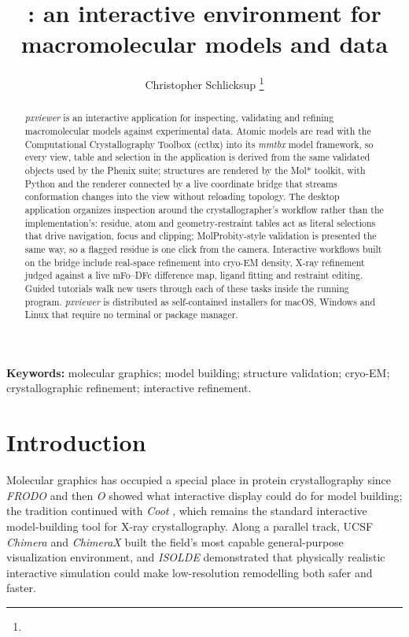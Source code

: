 \documentclass[11pt]{article}
\title{\pxviewer: an interactive environment for macromolecular models and data}
\author{Christopher Schlicksup%
  \thanks{\todo{affiliation and contact email}}}
\date{}
\newcommand{\pxviewer}{\emph{pxviewer}}
\begin{document}
\maketitle

\begin{abstract}
\pxviewer{} is an interactive application for inspecting, validating and
refining macromolecular models against experimental data. Atomic models are
read with the Computational Crystallography Toolbox (cctbx) into its
\emph{mmtbx} model framework, so every view, table and selection in the
application is derived from the same validated objects used by the Phenix
suite; structures are rendered by the Mol* toolkit, with Python and the
renderer connected by a live coordinate bridge that streams conformation
changes into the view without reloading topology. The desktop application
organizes inspection around the crystallographer's workflow rather than the
implementation's: residue, atom and geometry-restraint tables act as literal
selections that drive navigation, focus and clipping; MolProbity-style
validation is presented the same way, so a flagged residue is one click from
the camera. Interactive workflows built on the bridge include real-space
refinement into cryo-EM density, X-ray refinement judged against a live
mFo--DFc difference map, ligand fitting and restraint editing. Guided
tutorials walk new users through each of these tasks inside the running
program. \pxviewer{} is distributed as self-contained installers for macOS,
Windows and Linux that require no terminal or package manager.
\end{abstract}

\textbf{Keywords:} molecular graphics; model building; structure validation;
cryo-EM; crystallographic refinement; interactive refinement.

\section{Introduction}

Molecular graphics has occupied a special place in protein crystallography
since \emph{FRODO} \citep{frodo1978} and then \emph{O} \citep{o1991} showed
what interactive display could do for model building; the tradition continued
with \emph{Coot} \citep{coot2004, coot2010}, which remains the standard
interactive model-building tool for X-ray crystallography. Along a parallel
track, UCSF \emph{Chimera} and \emph{ChimeraX} \citep{chimera2004,
chimerax2018, chimerax2021} built the field's most capable general-purpose
visualization environment, and \emph{ISOLDE} \citep{isolde2018} demonstrated
that physically realistic interactive simulation could make low-resolution
remodelling both safer and faster.
\end{document}
